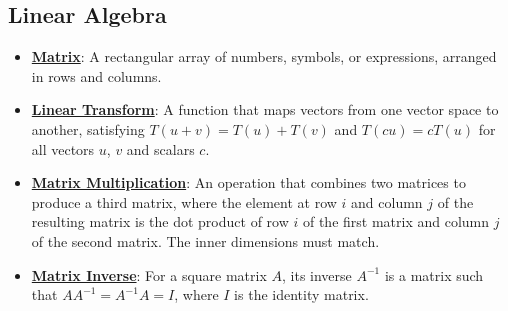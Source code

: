 \documentclass{article}%
\begin{document}
\subsection{Linear Algebra}%
\label{subsec:LinearAlgebra}%
\begin{itemize}[leftmargin=*]%
\item \href{\url{https://purdue.brightspace.com/d2l/common/assets/pdfjs-d2l-dist/1.0.14-legacy/web/viewer.html?file=\%252Fcontent\%252Fenforced\%252F1095467-wl.202510.CS.24300.001\%252F04L1-Linear\%20Algebra\%20Primer.pdf\%253Fou\%253D1095467\&lang=en-us\&container=d2l-fileviewer-rendered-pdf\&fullscreen=d2l-fileviewer-rendered-pdf-dialog\&height=667}#page=4}{\textbf{Matrix}}: A rectangular array of numbers, symbols, or expressions, arranged in rows and columns.%
\item \href{\url{https://purdue.brightspace.com/d2l/common/assets/pdfjs-d2l-dist/1.0.14-legacy/web/viewer.html?file=\%252Fcontent\%252Fenforced\%252F1095467-wl.202510.CS.24300.001\%252F04L1-Linear\%20Algebra\%20Primer.pdf\%253Fou\%253D1095467\&lang=en-us\&container=d2l-fileviewer-rendered-pdf\&fullscreen=d2l-fileviewer-rendered-pdf-dialog\&height=667}#page=5}{\textbf{Linear Transform}}: A function that maps vectors from one vector space to another, satisfying $T(u + v) = T(u) + T(v)$ and $T(cu) = cT(u)$ for all vectors $u$, $v$ and scalars $c$.%
\item \href{\url{https://purdue.brightspace.com/d2l/common/assets/pdfjs-d2l-dist/1.0.14-legacy/web/viewer.html?file=\%252Fcontent\%252Fenforced\%252F1095467-wl.202510.CS.24300.001\%252F04L1-Linear\%20Algebra\%20Primer.pdf\%253Fou\%253D1095467\&lang=en-us\&container=d2l-fileviewer-rendered-pdf\&fullscreen=d2l-fileviewer-rendered-pdf-dialog\&height=667}#page=14}{\textbf{Matrix Multiplication}}: An operation that combines two matrices to produce a third matrix, where the element at row $i$ and column $j$ of the resulting matrix is the dot product of row $i$ of the first matrix and column $j$ of the second matrix. The inner dimensions must match.%
\item \href{\url{https://purdue.brightspace.com/d2l/common/assets/pdfjs-d2l-dist/1.0.14-legacy/web/viewer.html?file=\%252Fcontent\%252Fenforced\%252F1095467-wl.202510.CS.24300.001\%252F04L1-Linear\%20Algebra\%20Primer.pdf\%253Fou\%253D1095467\&lang=en-us\&container=d2l-fileviewer-rendered-pdf\&fullscreen=d2l-fileviewer-rendered-pdf-dialog\&height=667}#page=10}{\textbf{Matrix Inverse}}: For a square matrix $A$, its inverse $A^{-1}$ is a matrix such that $AA^{-1} = A^{-1}A = I$, where $I$ is the identity matrix.%

\end{itemize}
\end{document}
